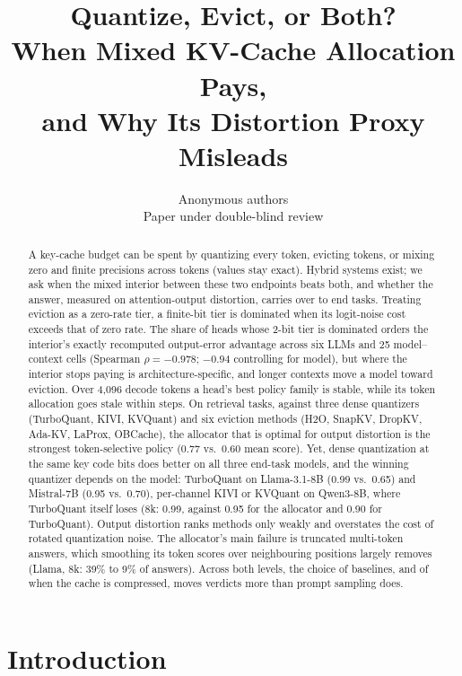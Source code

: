 \documentclass{article}
\title{Quantize, Evict, or Both?\\
When Mixed KV-Cache Allocation Pays,\\
and Why Its Distortion Proxy Misleads}
\author{Anonymous authors \\ Paper under double-blind review}
\theoremstyle{definition}
\begin{document}
\maketitle

\begin{abstract}
A key-cache budget can be spent by quantizing every token, evicting tokens, or mixing zero and finite precisions across tokens (values stay exact).  Hybrid systems exist; we ask when the mixed interior between these two endpoints beats both, and whether the answer, measured on attention-output distortion, carries over to end tasks.  Treating eviction as a zero-rate tier, a finite-bit tier is dominated when its logit-noise cost exceeds that of zero rate.  The share of heads whose 2-bit tier is dominated orders the interior's exactly recomputed output-error advantage across six LLMs and 25 model--context cells (Spearman $\rho=-0.978$; $-0.94$ controlling for model), but where the interior stops paying is architecture-specific, and longer contexts move a model toward eviction.  Over 4,096 decode tokens a head's best policy family is stable, while its token allocation goes stale within steps.  On retrieval tasks, against three dense quantizers (TurboQuant, KIVI, KVQuant) and six eviction methods (H2O, SnapKV, DropKV, Ada-KV, LaProx, OBCache), the allocator that is optimal for output distortion is the strongest token-selective policy (0.77 vs.\ 0.60 mean score).  
Yet, %
dense quantization at the same key code bits does better on all three end-task models, and the winning quantizer depends on the model: TurboQuant on Llama-3.1-8B (0.99 vs.\ 0.65) and Mistral-7B (0.95 vs.\ 0.70), per-channel KIVI or KVQuant on Qwen3-8B, where TurboQuant itself loses (8k: 0.99, against 0.95 for the allocator and 0.90 for TurboQuant).  Output distortion ranks methods only weakly and overstates the cost of rotated quantization noise.  The allocator's main failure is truncated multi-token answers, which smoothing its token scores over neighbouring positions largely removes (Llama, 8k: 39\% to 9\% of answers).  Across both levels, the choice of baselines, and of when the cache is compressed, moves verdicts more than prompt sampling does.
\end{abstract}

\section{Introduction}
\label{sec:intro}
\end{document}
